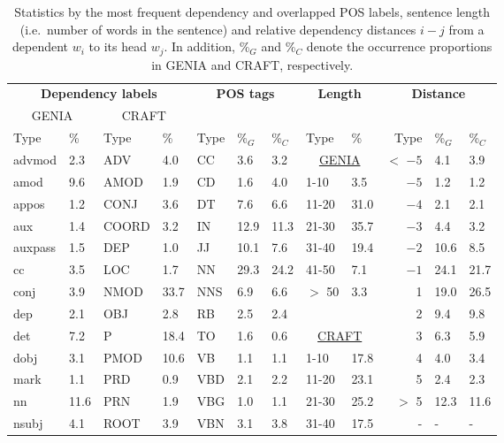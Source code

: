 \documentclass[twocolumn,hyperref]{bmcart}\pdfoutput=1
\begin{document}
\begin{table*}[!t]
\centering
\caption{Statistics   by the most frequent dependency and overlapped POS labels, sentence length (i.e.\ number of words in the sentence) and relative dependency distances $i-j$ from a dependent $w_i$ to its head $w_j$. In addition,  \%$_{G}$ and  \%$_{C}$ denote the occurrence proportions in GENIA and CRAFT, respectively.} 
\def\arraystretch{1.05}
\begin{tabular}{ll|ll|lll|ll|rll}
\hline
 \multicolumn{4}{c|}{\bf Dependency labels} &  \multicolumn{3}{c|}{\multirow{2}{*}{\bf POS tags}} &  \multicolumn{2}{c|}{\multirow{2}{*}{\bf Length}} &  \multicolumn{3}{c}{\multirow{2}{*}{\bf Distance}}\\
\cline{1-4}
\multicolumn{2}{c|}{GENIA} & \multicolumn{2}{c|}{CRAFT} & & &  & & & &  \\
\hline
Type & \%  &   Type & \%  & Type & \%$_{G}$ & \%$_{C}$ & Type & \% & Type & \%$_{G}$ & \%$_{C}$    \\
\hline
advmod & 2.3 &  ADV & 4.0 & CC & 3.6  & 3.2 & \multicolumn{2}{c|}{\underline{GENIA}}  &  ${<}$ $-5$ & 4.1 & 3.9 \\
amod & 9.6 &  AMOD & 1.9 &CD & 1.6 & 4.0 & 1-10 & 3.5 &  $-5$ &  1.2 & 1.2 \\ 
appos & 1.2 & CONJ & 3.6 &DT & 7.6 & 6.6 &11-20 & 31.0 &  $-4$ & 2.1 & 2.1\\ 
aux & 1.4 & COORD & 3.2 &IN & 12.9 & 11.3  &21-30 & 35.7 & $-3$ & 4.4 & 3.2  \\ 
auxpass & 1.5 &DEP & 1.0 &JJ & 10.1 & 7.6  & 31-40 & 19.4 &  $-2$ & 10.6 & 8.5  \\ 
cc & 3.5 &LOC & 1.7 &NN & 29.3& 24.2  &41-50 & 7.1 & $-1$ &  24.1 &  21.7 \\ 
conj & 3.9 &NMOD & 33.7 &NNS & 6.9 & 6.6 &  $>$ 50 & 3.3 &  1 &  19.0 &  26.5 \\
dep & 2.1 &OBJ & 2.8 &RB & 2.5 & 2.4 &  &   & 2 & 9.4 & 9.8  \\
det & 7.2 & P & 18.4 &TO & 1.6 & 0.6  & \multicolumn{2}{c|}{\underline{CRAFT}}  & 3 & 6.3  &  5.9 \\
dobj & 3.1 &PMOD & 10.6 &VB & 1.1  & 1.1 &1-10 & 17.8 & 4 & 4.0  & 3.4  \\
mark & 1.1 &  PRD & 0.9 & VBD & 2.1& 2.2 & 11-20 & 23.1 &  5 &2.4  & 2.3 \\
nn & 11.6 &PRN & 1.9 &VBG & 1.0& 1.1 &  21-30 & 25.2 & $>$ 5 & 12.3  & 11.6  \\ 
nsubj & 4.1 &ROOT & 3.9 &VBN & 3.1& 3.8 &31-40 & 17.5 & - & -  & - \\ 

\end{tabular}
\end{table*}
\end{document}
